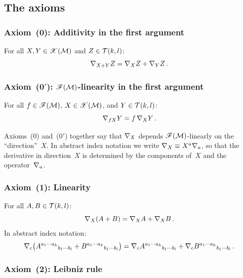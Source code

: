 \subsection{The axioms}\label{sec:connection-axioms}

\subsubsection*{Axiom~(0): Additivity in the first argument}

For all $X,Y\in\mathscr{X}(\mathcal{M})$ and $Z\in\mathcal{T}(k,l)$:
\begin{equation}\label{eq:axiom0}
  \nabla_{X+Y} Z = \nabla_X Z + \nabla_Y Z\,.
\end{equation}

\subsubsection*{Axiom~(0$'$): $\mathscr{F}(\mathcal{M})$-linearity in
the first argument}

For all $f\in\mathscr{F}(\mathcal{M})$, $X\in\mathscr{X}(\mathcal{M})$, and
$Y\in\mathcal{T}(k,l)$:
\begin{equation}\label{eq:axiom0prime}
  \nabla_{fX} Y = f\,\nabla_X Y\,.
\end{equation}

\begin{remark}
  Axioms~(0) and~(0$'$) together say that $\nabla_X$ depends
  $\mathscr{F}(\mathcal{M})$-linearly on the ``direction''~$X$.  In
  abstract index notation we write
  $\nabla_X \equiv X^a\nabla_a$, so that the derivative in
  direction~$X$ is determined by the components of~$X$ and the
  operator~$\nabla_a$.
\end{remark}

\subsubsection*{Axiom~(1): Linearity}

For all $A,B\in\mathcal{T}(k,l)$:
\begin{equation}\label{eq:axiom1}
  \nabla_X(A + B) = \nabla_X A + \nabla_X B\,.
\end{equation}
In abstract index notation:
\[
  \nabla_c\bigl(
    A^{a_1\cdots a_k}{}_{b_1\cdots b_l}
    + B^{a_1\cdots a_k}{}_{b_1\cdots b_l}
  \bigr)
  = \nabla_c A^{a_1\cdots a_k}{}_{b_1\cdots b_l}
  + \nabla_c B^{a_1\cdots a_k}{}_{b_1\cdots b_l}\,.
\]

\subsubsection*{Axiom~(2): Leibniz rule}

